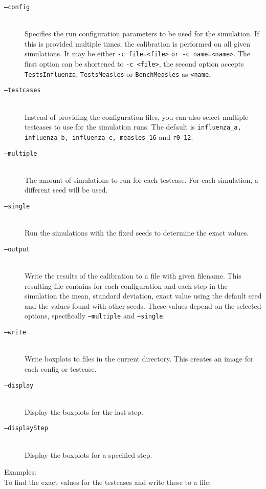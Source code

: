 \begin{description}
    \item[\texttt{--config}] \ \\
        Specifies the run configuration parameters to be used for the simulation.
        If this is provided multiple times, the calibration is performed on all given simulations.
        It may be either \texttt{-c file=<file>} \texttt{or -c name=<name>}.
        The first option can be shortened to \texttt{-c <file>}, the second option accepts \texttt{TestsInfluenza}, \texttt{TestsMeasles} or \texttt{BenchMeasles} as  \texttt{<name}.
    \item[\texttt{--testcases}] \ \\
        Instead of providing the configuration files, you can also select multiple testcases to use for the simulation runs.
        The default is \texttt{influenza\_a, influenza\_b, influenza\_c, measles\_16} and \texttt{r0\_12}.
    \item[\texttt{--multiple}]\ \\
        The amount of simulations to run for each testcase. For each simulation, a different seed will be used.
    \item[\texttt{--single}]\ \\
        Run the simulations with the fixed seeds to determine the exact values.
    \item[\texttt{--output}]\ \\
        Write the results of the calibration to a file with given filename.
        This resulting file contains for each configuration and each step in the simulation the mean, standard deviation, exact value using the default seed and the values found with other seeds.
        These values depend on the selected options, specifically \texttt{--multiple} and \texttt{--single}.
    \item[\texttt{--write}]\ \\
        Write boxplots to files in the current directory. This creates an image for each config or testcase.
    \item[\texttt{--display}]\ \\
        Display the boxplots for the last step.
    \item[\texttt{--displayStep}]\ \\
        Display the boxplots for a specified step.
\end{description}

Examples:\\
To find the exact values for the testcases and write these to a file:\\

